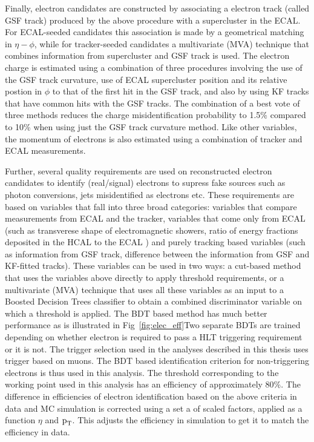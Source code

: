 Finally, electron candidates are constructed by associating a electron track (called GSF track) produced by the above procedure with a supercluster in the ECAL. For ECAL-seeded candidates this association is made by a geometrical matching in $\eta-\phi$, while for tracker-seeded candidates a multivariate (MVA) technique that combines information from supercluster and GSF track is used. The electron charge is estimated using a combination of three procedures involving the use of the GSF track curvature, use of ECAL supercluster position and its relative postion in $\phi$ to that of the first hit in the GSF track, and also by using KF tracks that have common hits with the GSF tracks. The combination of a best vote of three methods reduces the charge misidentification probability to 1.5\%  compared to 10\% when using just the GSF track curvature method. Like other variables, the momentum of electrons is also estimated using a combination of tracker and ECAL measurements.


Further, several quality requirements are used on reconstructed electron candidates to identify (real/signal) electrons to supress fake sources such as photon conversions, jets misidentified as electrons etc.
These requirements are based on variables that fall into three broad categories: variables that compare measurements from ECAL and the tracker, variables that come only from ECAL (such as transverese shape of electromagnetic showers, ratio of energy fractions deposited in the HCAL to the ECAL ) and purely tracking based variables (such as information from GSF track, difference between the information from GSF and KF-fitted tracks). These variables can be used in two ways: a cut-based method that uses the variables above directly to apply threshold requirements, or a multivariate (MVA) technique that uses all these variables as an input to a Boosted Decision Trees classifier to obtain a combined discriminator variable on which a threshold is applied. The BDT based method has much better performance as is illustrated in Fig~\ref{fig:elec_eff}Two separate BDTs are trained depending on whether electron is required to pass a HLT triggering requirement or it is not. The trigger selection used in the analyses described in this thesis uses trigger based on muons. The BDT based identification criterion for non-triggering electrons is thus used in this analysis. The threshold corresponding to the working point used in this analysis has an efficiency of approximately 80\%. The difference in efficiencies  of electron identification based on the above criteria in data and MC simulation is corrected using a set a of scaled factors, applied as a function $\eta$ and $\text{p}_\text{T}$. This adjusts the efficiency in simulation to get it to match the efficiency in data.  
   

